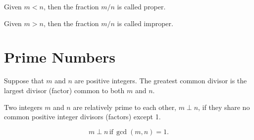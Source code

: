 \documentclass[20150903-160354-rs2.2-MarksMathNotebook.tex]{subfiles}
\begin{document}
\begin{definition}

Given $m<n$, then the fraction $m/n$ is called \alert{proper}.

\end{definition}

\begin{definition}

Given $m>n$, then the fraction $m/n$ is called \alert{improper}.

\end{definition}


\section{Prime Numbers}

\begin{definition}

Suppose that $m$ and $n$ are positive integers.  The greatest common divisor is the largest divisor (factor) common to both $m$ and $n$.

\end{definition}

\begin{definition}

Two integers $m$ and $n$ are relatively prime to each other, $m \perp n$, if they share no common positive integer divisors (factors) except 1.

\[
m \perp n \, \text{if} \, \gcd(m, n)=1.
\]
\end{definition}
\end{document}
